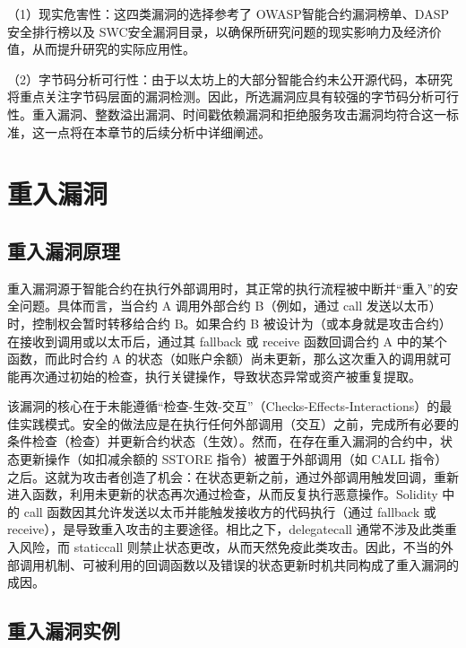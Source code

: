 \documentclass[print, master, vlined, timesmath]{DissertUESTC}
\begin{document}
（1）现实危害性：这四类漏洞的选择参考了 OWASP智能合约漏洞榜单\textsuperscript{\cite{owasp}}、DASP安全排行榜\textsuperscript{\cite{dasp}}以及 SWC安全漏洞目录\textsuperscript{\cite{swc}}，以确保所研究问题的现实影响力及经济价值，从而提升研究的实际应用性。

（2）字节码分析可行性：由于以太坊上的大部分智能合约未公开源代码，本研究将重点关注字节码层面的漏洞检测。因此，所选漏洞应具有较强的字节码分析可行性。重入漏洞、整数溢出漏洞、时间戳依赖漏洞和拒绝服务攻击漏洞均符合这一标准，这一点将在本章节的后续分析中详细阐述。


\section{重入漏洞}

\subsection{重入漏洞原理}

重入漏洞源于智能合约在执行外部调用时，其正常的执行流程被中断并“重入”的安全问题。具体而言，当合约 A 调用外部合约 B（例如，通过 call 发送以太币）时，控制权会暂时转移给合约 B。如果合约 B 被设计为（或本身就是攻击合约）在接收到调用或以太币后，通过其 fallback 或 receive 函数回调合约 A 中的某个函数，而此时合约 A 的状态（如账户余额）尚未更新，那么这次重入的调用就可能再次通过初始的检查，执行关键操作，导致状态异常或资产被重复提取。

该漏洞的核心在于未能遵循“检查-生效-交互”（Checks-Effects-Interactions）的最佳实践模式。安全的做法应是在执行任何外部调用（交互）之前，完成所有必要的条件检查（检查）并更新合约状态（生效）。然而，在存在重入漏洞的合约中，状态更新操作（如扣减余额的 SSTORE 指令）被置于外部调用（如 CALL 指令）之后。这就为攻击者创造了机会：在状态更新之前，通过外部调用触发回调，重新进入函数，利用未更新的状态再次通过检查，从而反复执行恶意操作。Solidity 中的 call 函数因其允许发送以太币并能触发接收方的代码执行（通过 fallback 或 receive），是导致重入攻击的主要途径。相比之下，delegatecall 通常不涉及此类重入风险，而 staticcall 则禁止状态更改，从而天然免疫此类攻击。因此，不当的外部调用机制、可被利用的回调函数以及错误的状态更新时机共同构成了重入漏洞的成因。

\subsection{重入漏洞实例}
\end{document}
